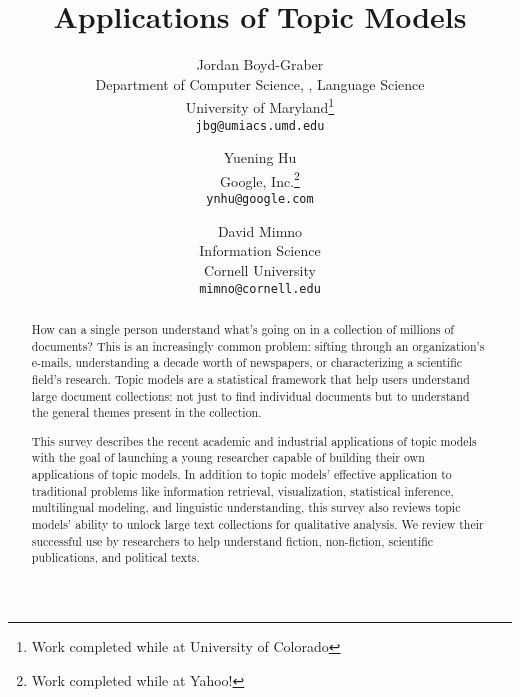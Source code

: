 \documentclass[openany]{now} %
\title{Applications of Topic Models}
\author{
Jordan Boyd-Graber \\
Department of Computer Science, \abr{umiacs}, Language Science \\
University of Maryland\footnote{Work completed while at University of Colorado} \\
\texttt{jbg@umiacs.umd.edu}
\and
Yuening Hu \\
Google, Inc.\footnote{Work completed while at Yahoo!} \\
\texttt{ynhu@google.com}
\and
David Mimno \\
Information Science \\
Cornell University \\
\texttt{mimno@cornell.edu}
}
\begin{document}
\copyrightowner{}

\frontmatter  %

\maketitle

\tableofcontents

\mainmatter

\begin{abstract}
  How can a single person understand what's going on in a collection
  of millions of documents?  This is an increasingly common problem:
  sifting through an organization's e-mails, understanding a decade
  worth of newspapers, or characterizing a scientific field's
  research.  Topic models are a statistical framework that help users
  understand large document collections: not just to find individual
  documents but to understand the general themes
  present in the collection.

  This survey describes the recent academic and industrial
  applications of topic models with the goal of launching a young
  researcher capable of building their own applications of topic
  models.  In addition to topic models' effective application to
  traditional problems like information retrieval, visualization,
  statistical inference, multilingual modeling, and linguistic
  understanding, this survey also reviews topic models' ability to
  unlock large text collections for qualitative analysis.  We review
  their successful use by researchers to help understand fiction,
  non-fiction, scientific publications, and political texts.
\end{abstract}












\backmatter  %




\clearpage

\printindex
\end{document}
